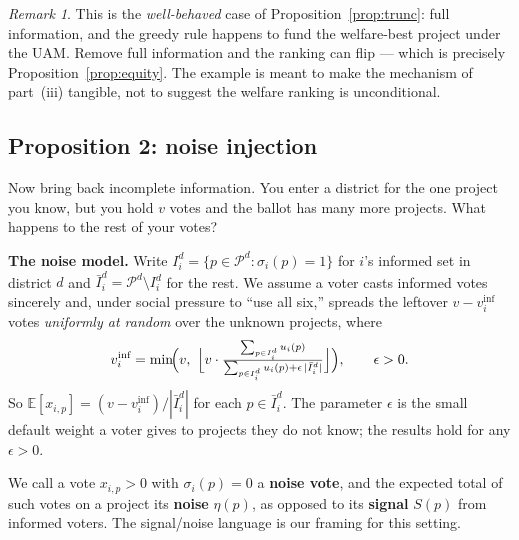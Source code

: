 \documentclass[11pt,letterpaper]{article}
\theoremstyle{definition}
\theoremstyle{plain}
\theoremstyle{remark}
\newtheorem*{remark}{Remark}
\newcommand{\E}{\mathbb{E}}
\newcommand{\Pset}{\mathcal{P}}
\newcommand{\votes}{v}
\begin{document}
\begin{remark}
This is the \emph{well-behaved} case of Proposition~\ref{prop:trunc}: full information, and the greedy
rule happens to fund the welfare-best project under the UAM. Remove full information and the ranking
can flip --- which is precisely Proposition~\ref{prop:equity}. The example is meant to make the mechanism
of part~(iii) tangible, not to suggest the welfare ranking is unconditional.
\end{remark}

\subsection{Proposition 2: noise injection}

Now bring back incomplete information. You enter a district for the one project you know, but you
hold $\votes$ votes and the ballot has many more projects. What happens to the rest of your votes?

\begin{aside}\small
\textbf{The noise model.} Write $I_i^d=\{p\in\Pset^d:\sigma_i(p)=1\}$ for $i$'s informed set in
district $d$ and $\bar I_i^d=\Pset^d\setminus I_i^d$ for the rest. We assume a voter casts informed
votes sincerely and, under social pressure to ``use all six,'' spreads the leftover
$\votes-\votes_i^{\text{inf}}$ votes \emph{uniformly at random} over the unknown projects, where
\[
  \votes_i^{\text{inf}}=\min\!\Bigl(\votes,\ \Bigl\lfloor \votes\cdot
  \tfrac{\sum_{p\in I_i^d}u_i(p)}{\sum_{p\in I_i^d}u_i(p)+\epsilon\,|\bar I_i^d|}\Bigr\rfloor\Bigr),
  \qquad \epsilon>0 .
\]
So $\E[x_{i,p}]=(\votes-\votes_i^{\text{inf}})/|\bar I_i^d|$ for each $p\in\bar I_i^d$. The
parameter $\epsilon$ is the small default weight a voter gives to projects they do not know; the
results hold for any $\epsilon>0$.
\end{aside}

\begin{naming}
We call a vote $x_{i,p}>0$ with $\sigma_i(p)=0$ a \textbf{noise vote}, and the expected total of
such votes on a project its \textbf{noise} $\eta(p)$, as opposed to its \textbf{signal} $S(p)$ from
informed voters. The signal/noise language is our framing for this setting.
\end{naming}
\end{document}
